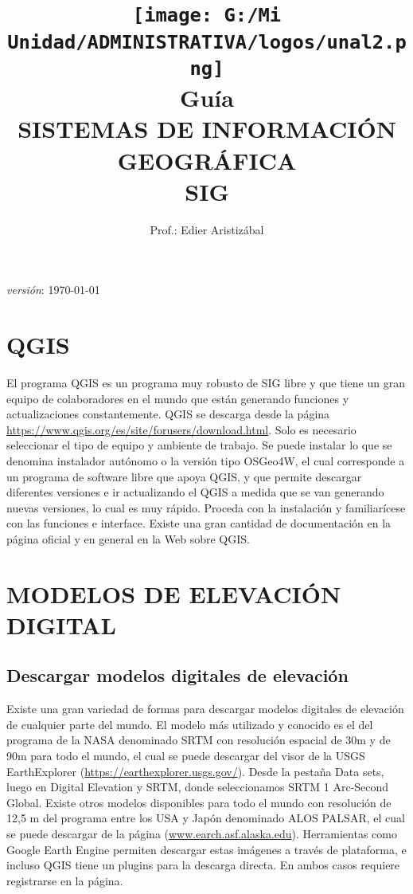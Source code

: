 \documentclass[a4paper,oneside,11pt,]{article}
\title {\texttt{[image: G:/Mi Unidad/ADMINISTRATIVA/logos/unal2.png]}\\[5ex]
Guía\\ SISTEMAS DE INFORMACIÓN GEOGRÁFICA\\SIG}
\author{
Prof.: Edier Aristizábal
\date{}
}
\begin{document}
\maketitle

\emph {versión}: \today

\section* {QGIS}
El programa QGIS es un programa muy robusto de SIG libre y que tiene un gran equipo de colaboradores en el mundo que están generando funciones y actualizaciones constantemente. QGIS se descarga desde la página \url{https://www.qgis.org/es/site/forusers/download.html}. Solo es necesario seleccionar el tipo de equipo y ambiente de trabajo. Se puede instalar lo que se denomina instalador autónomo o la versión tipo OSGeo4W, el cual corresponde a un programa de software libre que apoya QGIS, y que permite descargar diferentes versiones e ir actualizando el QGIS a medida que se van generando nuevas versiones, lo cual es muy rápido. Proceda con la instalación y familiarícese con las funciones e interface. Existe una gran cantidad de documentación en la página oficial y en general en la Web sobre QGIS.


\section{MODELOS DE ELEVACIÓN DIGITAL}

\subsection{Descargar modelos digitales de elevación}

Existe una gran variedad de formas para descargar modelos digitales de elevación de cualquier parte del mundo. El modelo más utilizado y conocido es el del programa de la NASA denominado SRTM con resolución espacial de 30m y de 90m para todo el mundo, el cual se puede descargar del visor de la USGS EarthExplorer (\url{https://earthexplorer.usgs.gov/}). Desde la pestaña Data sets, luego en Digital Elevation y SRTM, donde seleccionamos SRTM 1 Arc-Second Global.
Existe otros modelos disponibles para todo el mundo con resolución de 12,5 m del programa entre los USA y Japón denominado ALOS PALSAR, el cual se puede descargar de la página (\url{www.earch.asf.alaska.edu}). Herramientas como Google Earth Engine permiten descargar estas imágenes a través de plataforma, e incluso QGIS tiene un plugins para la descarga directa. En ambos casos requiere registrarse en la página.
\end{document}
